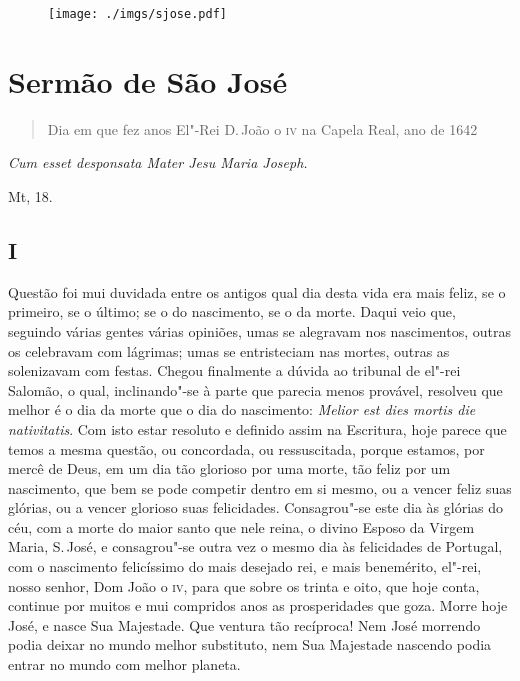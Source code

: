 \pagebreak
\thispagestyle{empty}
\movetoevenpage
\begin{figure}
\texttt{[image: ./imgs/sjose.pdf]}  
\end{figure}


\chapter{Sermão de São José}

\begin{quotation}
\noindent{}Dia em que fez anos El"-Rei D.\,João o \textsc{iv} na Capela Real, ano de 1642
\end{quotation}

\epigraph{\emph{Cum esset desponsata Mater Jesu Maria Joseph.}}{Mt, 18.}

\section{I}

\noindent{}Questão foi mui duvidada entre os antigos qual dia desta vida era mais
feliz, se o primeiro, se o último; se o do nascimento, se o da morte.
Daqui veio que, seguindo várias gentes várias opiniões, umas se
alegravam nos nascimentos, outras os celebravam com lágrimas; umas se
entristeciam nas mortes, outras as solenizavam com festas. Chegou
finalmente a dúvida ao tribunal de el"-rei Salomão, o qual, inclinando"-se
à parte que parecia menos provável, resolveu que melhor é o dia da morte
que o dia do nascimento: \emph{Melior est dies mortis die nativitatis}.
Com isto estar resoluto e definido assim na Escritura,
hoje parece que temos a mesma questão, ou concordada, ou ressuscitada,
porque estamos, por mercê de Deus, em um dia tão glorioso por uma morte,
tão feliz por um nascimento, que bem se pode competir dentro em si
mesmo, ou a vencer feliz suas glórias, ou a vencer glorioso suas
felicidades. Consagrou"-se este dia às glórias do céu, com a morte do
maior santo que nele reina, o divino Esposo da Virgem Maria, S.\,José, e
consagrou"-se outra vez o mesmo dia às felicidades de Portugal, com o
nascimento felicíssimo do mais desejado rei, e mais benemérito, el"-rei,
nosso senhor, Dom João o \textsc{iv}, para que sobre os trinta e oito, que hoje
conta, continue por muitos e mui compridos anos as prosperidades que
goza. Morre hoje José, e nasce Sua Majestade. Que ventura tão recíproca!
Nem José morrendo podia deixar no mundo melhor substituto, nem Sua
Majestade nascendo podia entrar no mundo com melhor planeta.

